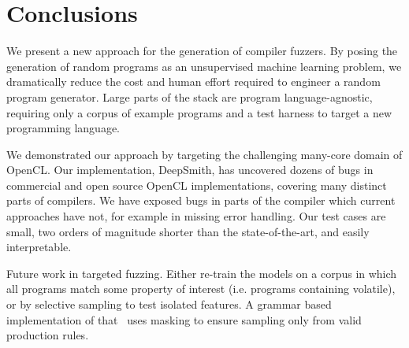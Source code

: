 \section{Conclusions}\label{sec:conclusion}

We present a new approach for the generation of compiler fuzzers. By posing the generation of random programs as an unsupervised machine learning problem, we dramatically reduce the cost and human effort required to engineer a random program generator. Large parts of the stack are program language-agnostic, requiring only a corpus of example programs and a test harness to target a new programming language.

We demonstrated our approach by targeting the challenging many-core domain of OpenCL. Our implementation, DeepSmith, has uncovered dozens of bugs in commercial and open source OpenCL implementations, covering many distinct parts of compilers. We have exposed bugs in parts of the compiler which current approaches have not, for example in missing error handling. Our test cases are small, two orders of magnitude shorter than the state-of-the-art, and easily interpretable.

 Future work in targeted fuzzing. Either re-train the models on a corpus in which all programs match some property of interest (i.e. programs containing volatile), or by selective sampling to test isolated features. A grammar based implementation of that~\cite{Kusner2017} uses masking to ensure sampling only from valid production rules.

